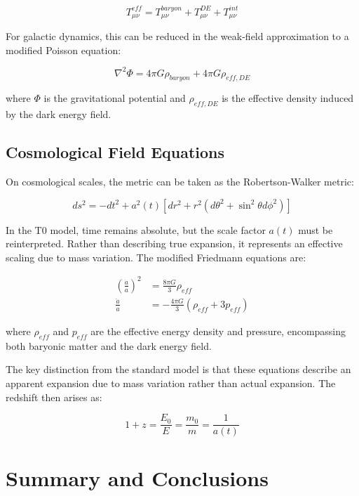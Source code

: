 \documentclass[a4paper,12pt]{article}
\begin{document}
	\begin{equation}
		T_{\mu\nu}^{eff} = T_{\mu\nu}^{baryon} + T_{\mu\nu}^{DE} + T_{\mu\nu}^{int}
	\end{equation}
	
	For galactic dynamics, this can be reduced in the weak-field approximation to a modified Poisson equation:
	
	\begin{equation}
		\nabla^2 \Phi = 4\pi G \rho_{baryon} + 4\pi G \rho_{eff,DE}
	\end{equation}
	
	where $\Phi$ is the gravitational potential and $\rho_{eff,DE}$ is the effective density induced by the dark energy field.
	
	\subsection{Cosmological Field Equations}
	
	On cosmological scales, the metric can be taken as the Robertson-Walker metric:
	
	\begin{equation}
		ds^2 = -dt^2 + a^2(t)[dr^2 + r^2(d\theta^2 + \sin^2\theta d\phi^2)]
	\end{equation}
	
	In the T0 model, time remains absolute, but the scale factor $a(t)$ must be reinterpreted. Rather than describing true expansion, it represents an effective scaling due to mass variation. The modified Friedmann equations are:
	
	\begin{align}
		\left(\frac{\dot{a}}{a}\right)^2 &= \frac{8\pi G}{3}\rho_{eff}\\
		\frac{\ddot{a}}{a} &= -\frac{4\pi G}{3}(\rho_{eff} + 3p_{eff})
	\end{align}
	
	where $\rho_{eff}$ and $p_{eff}$ are the effective energy density and pressure, encompassing both baryonic matter and the dark energy field.
	
	The key distinction from the standard model is that these equations describe an apparent expansion due to mass variation rather than actual expansion. The redshift then arises as:
	
	\begin{equation}
		1 + z = \frac{E_0}{E} = \frac{m_0}{m} = \frac{1}{a(t)}
	\end{equation}
	
	\section{Summary and Conclusions}
	
\end{document}
